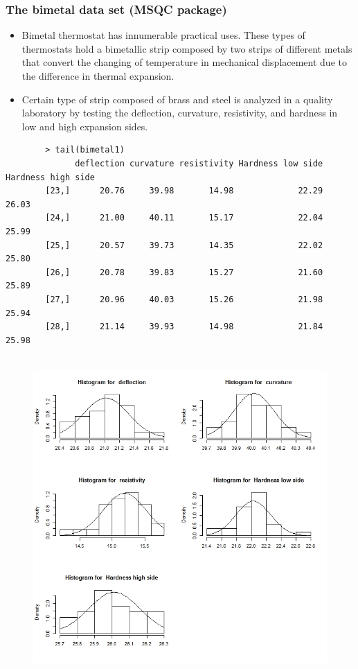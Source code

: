 \documentclass[]{report}
\begin{document}
\subsubsection{The bimetal data set (MSQC package)}
{\large
	\begin{itemize}
		\item Bimetal thermostat has innumerable practical uses. These types of thermostats hold
		a bimetallic strip composed by two strips of different metals that convert the
		changing of temperature in mechanical displacement due to the difference in
		thermal expansion.
		\item Certain type of strip composed of brass and steel is analyzed in a quality
		laboratory by testing the deflection, curvature, resistivity, and hardness in low
		and high expansion sides.
	\end{itemize}
	\begin{framed}
		\begin{verbatim}
		> tail(bimetal1)
		      deflection curvature resistivity Hardness low side Hardness high side
		[23,]      20.76     39.98       14.98             22.29             26.03
		[24,]      21.00     40.11       15.17             22.04             25.99
		[25,]      20.57     39.73       14.35             22.02             25.80
		[26,]      20.78     39.83       15.27             21.60             25.89
		[27,]      20.96     40.03       15.26             21.98             25.94
		[28,]      21.14     39.93       14.98             21.84             25.98
		
		\end{verbatim}
	\end{framed}
}
\newpage
\begin{figure}[h!]
	\centering
	\includegraphics[width=0.9\linewidth]{images/MSQC-bimetal1hist}
	\caption{}
	\label{fig:MSQC-bimetal1hist}
\end{figure}
\end{document}
